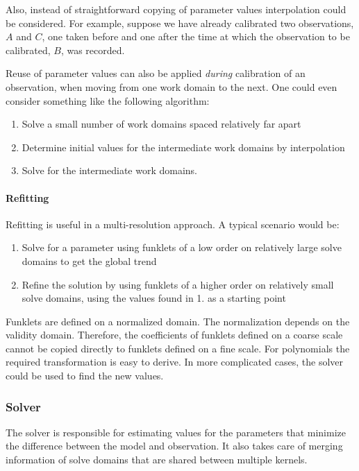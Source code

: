 \documentclass[10pt]{lofar}
\begin{document}
Also, instead of straightforward copying of parameter values interpolation could
be considered. For example, suppose we have already calibrated two observations,
$A$ and $C$, one taken before and one after the time at which the observation to
be calibrated, $B$, was recorded.

Reuse of parameter values can also be applied \emph{during} calibration of an
observation, when moving from one work domain to the next. One could even
consider something like the following algorithm:
\begin{enumerate}
\item Solve a small number of work domains spaced relatively far apart
\item Determine initial values for the intermediate work domains by
interpolation
\item Solve for the intermediate work domains.
\end{enumerate}

\paragraph{Refitting}
Refitting is useful in a multi-resolution approach. A typical scenario would be:
\begin{enumerate}
\item Solve for a parameter using funklets of a low order on
relatively large solve domains to get the global trend
\item Refine the solution by using funklets of a higher order on relatively
small solve domains, using the values found in 1. as a starting point
\end{enumerate}

Funklets are defined on a normalized domain. The normalization depends on the
validity domain. Therefore, the coefficients of funklets defined on a coarse
scale cannot be copied directly to funklets defined on a fine scale. For
polynomials the required transformation is easy to derive. In more complicated
cases, the solver could be used to find the new values.

\subsubsection{Solver}
\label{subsubsec:design-solver}

The solver is responsible for estimating values for the parameters that minimize
the difference between the model and observation. It also takes care of merging
information of solve domains that are shared between multiple kernels.
\end{document}
